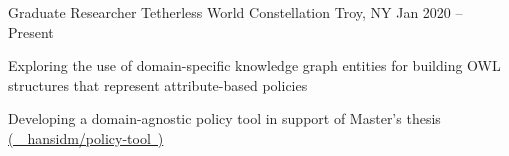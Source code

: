 
\begin{cventries}

  \cventry
  {Graduate Researcher}
  {Tetherless World Constellation}
  {Troy, NY}
  {Jan 2020 -- Present}
  {
    \begin{cvitems}
      \item {
                  Exploring the use of domain-specific knowledge graph entities for building OWL structures that represent attribute-based policies
            }
      \item {
                  Developing a domain-agnostic policy tool in support of Master's thesis \href{https://github.com/hansidm/policy_tool}{(\ \faGithubSquare\  hansidm/policy-tool\ )}
            }
    \end{cvitems}
  }
\end{cventries}